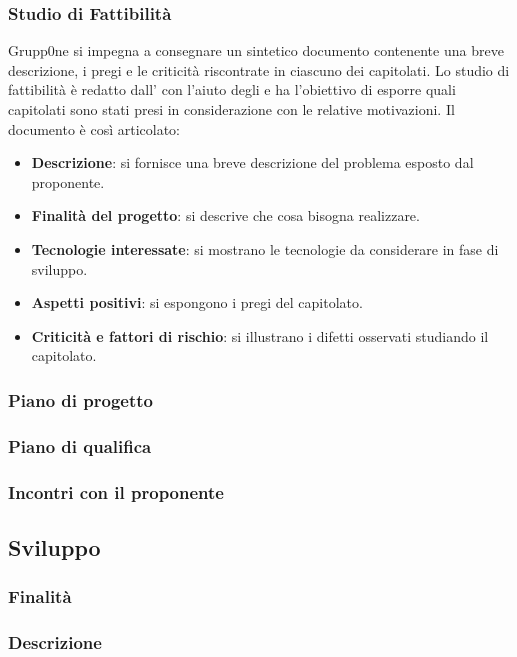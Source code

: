 \documentclass[../norme-di-progetto.tex]{subfiles}
\begin{document}
\subsubsection{Studio di Fattibilità}
\label{par:studio di fattibilità}
Grupp0ne si impegna a consegnare un sintetico documento contenente una breve descrizione, i pregi e le criticità riscontrate in ciascuno dei capitolati. Lo studio di fattibilità è redatto dall'
con l'aiuto degli  e ha l'obiettivo di esporre quali capitolati sono stati presi in considerazione con le relative motivazioni. Il documento è così articolato:
\begin{itemize}
\item \textbf{Descrizione}: si fornisce una breve descrizione del problema esposto dal proponente.
\item \textbf{Finalità del progetto}: si descrive che cosa bisogna realizzare.
\item \textbf{Tecnologie interessate}: si mostrano le tecnologie da considerare in fase di sviluppo.
\item \textbf{Aspetti positivi}: si espongono i pregi del capitolato.
\item \textbf{Criticità e fattori di rischio}: si illustrano i difetti osservati studiando il capitolato.
\end{itemize}
\subsubsection{Piano di progetto}
\label{par:piano di progetto}
\subsubsection{Piano di qualifica}
\label{par:piano di qualifica}
\subsubsection{Incontri con il proponente}
\label{subs:incontri con il proponente}
\subsection{Sviluppo}
\label{sub:sviluppo}
\subsubsection{Finalità}
\label{subs:finalità}
\subsubsection{Descrizione}
\label{subs:descrizione}
\end{document}
